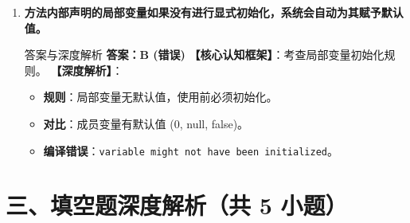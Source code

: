 ﻿\documentclass[12pt, a4paper]{ctexart}
\newcommand{\code}[1]{\texttt{#1}}
\begin{document}
\begin{enumerate}[label=\textbf{\arabic*.}, leftmargin=*, itemsep=1.5em]
	\item \textbf{方法内部声明的局部变量如果没有进行显式初始化，系统会自动为其赋予默认值。}
	      \begin{bluebox}{答案与深度解析}
		      \textbf{答案：B (错误)}
		      \textbf{【核心认知框架】}：考查局部变量初始化规则。
		      \textbf{【深度解析】}：
		      \begin{itemize}[leftmargin=*, nosep]
			      \item \textbf{规则}：局部变量无默认值，使用前必须初始化。
			      \item \textbf{对比}：成员变量有默认值 (0, null, false)。
			      \item \textbf{编译错误}：\code{variable might not have been initialized}。
		      \end{itemize}
	      \end{bluebox}
\end{enumerate}

\section*{三、填空题深度解析（共 5 小题）}
\end{document}
